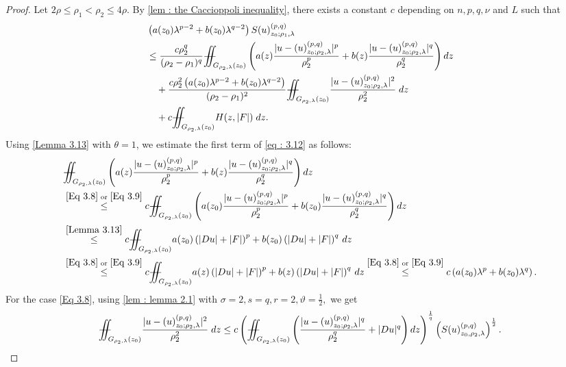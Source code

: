 \documentclass[11pt,oneside, english,reqno,twoside a4paper]{amsart}
\theoremstyle{definition}
\numberwithin{theorem}{section}
\numberwithin{equation}{section}
\newcommand{\iintss}{{\int\hspace{-0.28cm}\int}}
\newcommand{ \miints }{{\iintss\hspace{-0.56cm} -\hspace{-0.15cm}-}}
\newcommand{\miint}[1]{{\miints_{\hspace{-0.13cm}#1}}}
\begin{document}
\begin{proof}
Let $2\rho \leq \rho_1<\rho_2 \leq 4\rho$. By \cref{lem : the Caccioppoli inequality}, there exists a constant $c$ depending on $n,p,q,\nu$ and $L$ such that 
\begin{align}
&\left(a(z_0)\lambda^{p-2}+b(z_0)\lambda^{q-2}\right)S(u)^{(p,q)}_{z_0;\rho_1,\lambda}\nonumber\\
&\leq \frac{c\rho_2^q}{(\rho_2-\rho_1)^q}\miint{G_{\rho_2,\lambda}(z_0)}\left( a(z)\frac{|u-(u)^{(p,q)}_{z_0;\rho_2,\lambda}|^p}{\rho^p_2}+b(z)\frac{|u-(u)^{(p,q)}_{z_0;\rho_2,\lambda}|^q}{\rho^q_2} \right) dz \nonumber\\
&\quad + \frac{c\rho_2^2 \left(a(z_0)\lambda^{p-2}+b(z_0)\lambda^{q-2}\right)}{(\rho_2-\rho_1)^2}\miint{G_{\rho_2,\lambda}(z_0)}\frac{|u-(u)^{(p,q)}_{z_0;\rho_2,\lambda}|^2}{\rho_2^2}\; dz\nonumber\\\label{eq : 3.12}
&\quad +c\miint{G_{\rho_2,\lambda}(z_0)} H(z,|F|)\; dz.
\end{align}
Using \cref{Lemma 3.13} with $\theta =1$, we estimate the first term of \eqref{eq : 3.12} as follows:
\begin{align*}
 &\miint{G_{\rho_2,\lambda}(z_0)}\left( a(z)\frac{|u-(u)^{(p,q)}_{z_0;\rho_2,\lambda}|^p}{\rho^p_2}+b(z)\frac{|u-(u)^{(p,q)}_{z_0;\rho_2,\lambda}|^q}{\rho^q_2} \right) dz\\
 &\overset{\eqref{Eq 3.8}\,\, \text{or} \,\, \eqref{Eq 3.9}}{\leq} c\miint{G_{\rho_2,\lambda}(z_0)} \left(a(z_0)\frac{|u-(u)^{(p,q)}_{z_0;\rho_2,\lambda}|^p}{\rho^p_2}+b(z_0)\frac{|u-(u)^{(p,q)}_{z_0;\rho_2,\lambda}|^q}{\rho^q_2} \right) dz\\
 &\overset{\cref{Lemma 3.13}}{\leq} c\miint{G_{\rho_2,\lambda}(z_0)}a(z_0)\left(|Du|+|F|\right)^p+b(z_0)\left(|Du|+|F|\right)^q\,dz\\
 &\overset{\eqref{Eq 3.8}\,\, \text{or} \,\, \eqref{Eq 3.9}}{\leq} c \miint{G_{\rho_2,\lambda}(z_0)}a(z)\left(|Du|+|F|\right)^p+b(z)\left(|Du|+|F|\right)^q\,dz\overset{\eqref{Eq 3.8}\,\, \text{or} \,\, \eqref{Eq 3.9}}{\leq}c\left(a(z_0)\lambda^p+b(z_0)\lambda^q\right).
\end{align*}
For the case \eqref{Eq 3.8},  using \cref{lem : lemma 2.1} with $\sigma =2, s=q, r=2, \vartheta=\frac{1}{2},$ we get
\begin{align*}
   \miint{G_{\rho_2,\lambda}(z_0)}\frac{|u-(u)^{(p,q)}_{z_0;\rho_2,\lambda}|^2}{\rho_2^2}\; dz \leq c\left(\miint{G_{\rho_2, \lambda}(z_0)}\left(\frac{|u-(u)^{(p,q)}_{z_0;\rho_2,\lambda}|^q}{\rho_2^q}+|Du|^q\right)dz\right)^{\frac{1}{q}}\left(S(u)^{(p,q)}_{z_0, \rho_2, \lambda}\right)^{\frac{1}{2}}.

\end{align*}
\end{proof}
\end{document}
